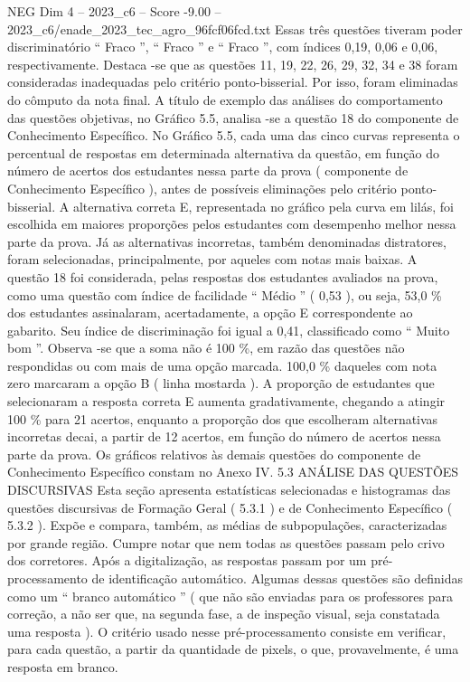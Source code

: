 \begin{textsample}{NEG Dim 4 – 2023\_c6 – Score -9.00 – 2023\_c6/enade\_2023\_tec\_agro\_96fcf06fcd.txt}
Essas três questões tiveram poder discriminatório “ Fraco ”, “ Fraco ” e “ Fraco ”, com índices 0,19, 0,06 e 0,06, respectivamente.
Destaca -se que as questões 11, 19, 22, 26, 29, 32, 34 e 38 foram consideradas inadequadas pelo critério ponto-bisserial.
Por isso, foram eliminadas do cômputo da nota final.
A título de exemplo das análises do comportamento das questões objetivas, no Gráfico 5.5, analisa -se a questão 18 do componente de Conhecimento Específico.
No Gráfico 5.5, cada uma das cinco curvas representa o percentual de respostas em determinada alternativa da questão, em função do número de acertos dos estudantes nessa parte da prova ( componente de Conhecimento Específico ), antes de possíveis eliminações pelo critério ponto-bisserial.
A alternativa correta E, representada no gráfico pela curva em lilás, foi escolhida em maiores proporções pelos estudantes com desempenho melhor nessa parte da prova.
Já as alternativas incorretas, também denominadas distratores, foram selecionadas, principalmente, por aqueles com notas mais baixas.
A questão 18 foi considerada, pelas respostas dos estudantes avaliados na prova, como uma questão com índice de facilidade “ Médio ” ( 0,53 ), ou seja, 53,0 \% dos estudantes assinalaram, acertadamente, a opção E correspondente ao gabarito.
Seu índice de discriminação foi igual a 0,41, classificado como “ Muito bom ”.
Observa -se que a soma não é 100 \%, em razão das questões não respondidas ou com mais de uma opção marcada. 100,0 \% daqueles com nota zero marcaram a opção B ( linha mostarda ).
A proporção de estudantes que selecionaram a resposta correta E aumenta gradativamente, chegando a atingir 100 \% para 21 acertos, enquanto a proporção dos que escolheram alternativas incorretas decai, a partir de 12 acertos, em função do número de acertos nessa parte da prova.
Os gráficos relativos às demais questões do componente de Conhecimento Específico constam no Anexo IV. 5.3 ANÁLISE DAS QUESTÕES DISCURSIVAS Esta seção apresenta estatísticas selecionadas e histogramas das questões discursivas de Formação Geral ( 5.3.1 ) e de Conhecimento Específico ( 5.3.2 ).
Expõe e compara, também, as médias de subpopulações, caracterizadas por grande região.
Cumpre notar que nem todas as questões passam pelo crivo dos corretores.
Após a digitalização, as respostas passam por um pré-processamento de identificação automático.
Algumas dessas questões são definidas como um “ branco automático ” ( que não são enviadas para os professores para correção, a não ser que, na segunda fase, a de inspeção visual, seja constatada uma resposta ).
O critério usado nesse pré-processamento consiste em verificar, para cada questão, a partir da quantidade de pixels, o que, provavelmente, é uma resposta em branco.

\end{textsample}
